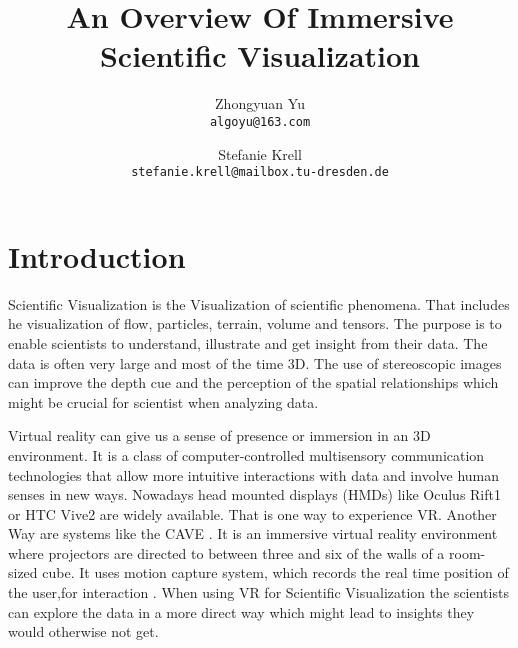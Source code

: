\documentclass[10pt,twocolumn,letterpaper]{article}
\begin{document}
\title{An Overview Of Immersive Scientific Visualization}

\author{Zhongyuan Yu\\
{\tt\small algoyu@163.com}
\and
Stefanie Krell\\
{\tt\small stefanie.krell@mailbox.tu-dresden.de}
}

\maketitle


\section{Introduction}

Scientific Visualization is the Visualization of scientific phenomena. That includes he visualization of flow, particles, terrain, volume and tensors. The purpose is to enable scientists to understand, illustrate and get insight from their data. The data is often very large and most of the time 3D.  The use of stereoscopic images can improve the depth cue and the perception of the spatial relationships which might be crucial for scientist when analyzing data. 


\setlength{\parindent}{1pc}
Virtual reality can give us a sense of presence or immersion in an 3D environment. It is a class of computer-controlled multisensory communication technologies that allow more intuitive interactions with data and involve human senses in new ways. Nowadays head mounted displays
(HMDs) like Oculus Rift1 or HTC Vive2 are widely available. That is one way to experience VR. Another Way are systems like the CAVE \cite{Wiebrands2018}. It is an immersive virtual reality environment where projectors are directed to between three and six of the walls of a room-sized cube. It uses motion capture system, which records the real time position of the user,for interaction . When using VR for Scientific Visualization the scientists can explore the data in a more direct way which might lead to insights they would otherwise not get. 
\end{document}
